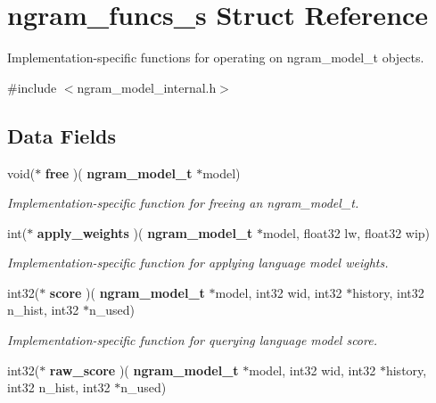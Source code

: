 \section{ngram\+\_\+funcs\+\_\+s Struct Reference}
\label{structngram__funcs__s}


Implementation-\/specific functions for operating on ngram\+\_\+model\+\_\+t objects.  




{\ttfamily \#include $<$ngram\+\_\+model\+\_\+internal.\+h$>$}

\subsection*{Data Fields}
\begin{DoxyCompactItemize}
\item 
\mbox{\label{structngram__funcs__s_ae13797f51aee31ddde0f150c1bbe1570}} 
void($\ast$ \textbf{ free} )(\textbf{ ngram\+\_\+model\+\_\+t} $\ast$model)
\begin{DoxyCompactList}\small\item\em Implementation-\/specific function for freeing an ngram\+\_\+model\+\_\+t. \end{DoxyCompactList}\item 
\mbox{\label{structngram__funcs__s_ae3cc072e20e6c1556c91b783ec061a4a}} 
int($\ast$ \textbf{ apply\+\_\+weights} )(\textbf{ ngram\+\_\+model\+\_\+t} $\ast$model, float32 lw, float32 wip)
\begin{DoxyCompactList}\small\item\em Implementation-\/specific function for applying language model weights. \end{DoxyCompactList}\item 
\mbox{\label{structngram__funcs__s_ab74c094f1e88465559fdd29859bf4395}} 
int32($\ast$ \textbf{ score} )(\textbf{ ngram\+\_\+model\+\_\+t} $\ast$model, int32 wid, int32 $\ast$history, int32 n\+\_\+hist, int32 $\ast$n\+\_\+used)
\begin{DoxyCompactList}\small\item\em Implementation-\/specific function for querying language model score. \end{DoxyCompactList}\item 
\mbox{\label{structngram__funcs__s_a9c9f83dc5151495a21b7eff16ad747d3}} 
int32($\ast$ \textbf{ raw\+\_\+score} )(\textbf{ ngram\+\_\+model\+\_\+t} $\ast$model, int32 wid, int32 $\ast$history, int32 n\+\_\+hist, int32 $\ast$n\+\_\+used)

\end{DoxyCompactItemize}
